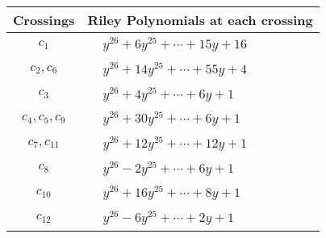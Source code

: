 \documentclass[1p]{elsarticle_modified}
\theoremstyle{definition}
\begin{document}
\begin{tabular}{m{50pt}|m{274pt}}
Crossings & \hspace{64pt}Riley Polynomials at each crossing \\
\hline $$\begin{aligned}c_{1}\end{aligned}$$&$\begin{aligned}
&y^{26}+6 y^{25}+\cdots+15 y+16
\end{aligned}$\\
\hline $$\begin{aligned}c_{2},c_{6}\end{aligned}$$&$\begin{aligned}
&y^{26}+14 y^{25}+\cdots+55 y+4
\end{aligned}$\\
\hline $$\begin{aligned}c_{3}\end{aligned}$$&$\begin{aligned}
&y^{26}+4 y^{25}+\cdots+6 y+1
\end{aligned}$\\
\hline $$\begin{aligned}c_{4},c_{5},c_{9}\end{aligned}$$&$\begin{aligned}
&y^{26}+30 y^{25}+\cdots+6 y+1
\end{aligned}$\\
\hline $$\begin{aligned}c_{7},c_{11}\end{aligned}$$&$\begin{aligned}
&y^{26}+12 y^{25}+\cdots+12 y+1
\end{aligned}$\\
\hline $$\begin{aligned}c_{8}\end{aligned}$$&$\begin{aligned}
&y^{26}-2 y^{25}+\cdots+6 y+1
\end{aligned}$\\
\hline $$\begin{aligned}c_{10}\end{aligned}$$&$\begin{aligned}
&y^{26}+16 y^{25}+\cdots+8 y+1
\end{aligned}$\\
\hline $$\begin{aligned}c_{12}\end{aligned}$$&$\begin{aligned}
&y^{26}-6 y^{25}+\cdots+2 y+1
\end{aligned}$\\
\hline
\end{tabular}\\~\\
\end{document}

